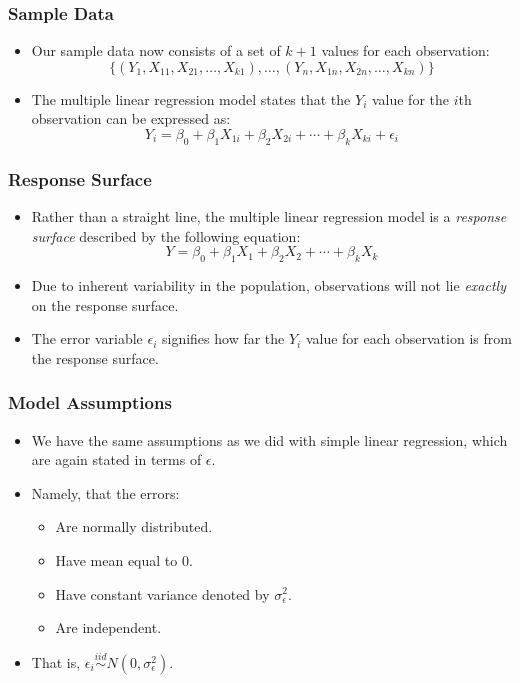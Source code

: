 \documentclass[14pt]{beamer}
\begin{document}
\begin{frame}
	\frametitle{Sample Data}
	
	\begin{itemize}[label={\color{blue}$\blacktriangleright$}]
		\item Our sample data now consists of a set of $k+1$ values for each observation:
		\[
		\{(Y_1, X_{11}, X_{21}, \ldots, X_{k1}),\ldots,(Y_n, X_{1n}, X_{2n},\ldots, X_{kn})\}
		\]
		
		\item The multiple linear regression model states that the $Y_i$ value for the $i$th observation can be expressed as:
		\[
		Y_i = \beta_0 + \beta_1X_{1i} + \beta_2X_{2i} + \cdots + \beta_kX_{ki} + \epsilon_i
		\]
	\end{itemize}
	
\end{frame}
\begin{frame}
	\frametitle{Response Surface}
	
	\begin{itemize}[label={\color{blue}$\blacktriangleright$}]
		\item Rather than a straight line, the multiple linear regression model is a \textit{response surface} described by the following equation:
		\[
		Y = \beta_0 + \beta_1X_1 + \beta_2X_2 + \cdots + \beta_kX_k
		\]
		
		\item Due to inherent variability in the population, observations will not lie \textit{exactly} on the response surface.
		
		\item The error variable $\epsilon_i$ signifies how far the $Y_i$ value for each observation is from the response surface.
	\end{itemize}
	
\end{frame}
\begin{frame}
	\frametitle{Model Assumptions}
	
	\begin{itemize}[label={\color{blue}$\blacktriangleright$}]
		\item We have the same assumptions as we did with simple linear regression, which are again stated in terms of $\epsilon$.
		\item Namely, that the errors:
		\begin{itemize}[label={\color{blue}$\blacktriangleright$}]
			\item Are normally distributed.
			\item Have mean equal to 0.
			\item Have constant variance denoted by $\sigma_\epsilon^2$.
			\item Are independent.
		\end{itemize}
		\item That is, $\epsilon_i \overset{iid}{\sim} N(0,\sigma_\epsilon^2)$.
	\end{itemize}
	
\end{frame}
\end{document}
